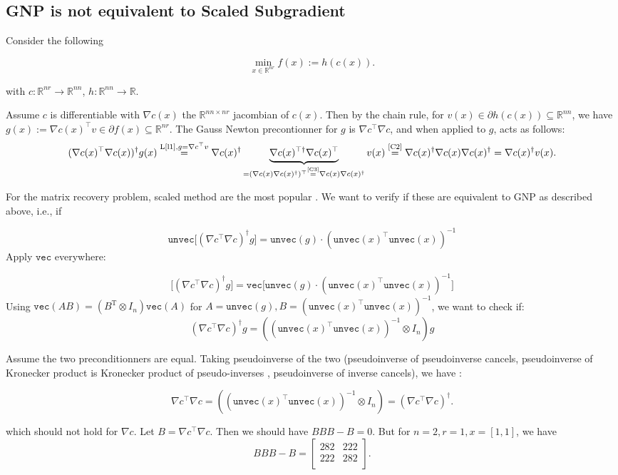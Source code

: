 \documentclass{article}
\begin{document}
\subsection{GNP is not equivalent to Scaled Subgradient}



Consider the following

$$
\min_{x\in \mathbb{R}^{nr} } f(x):= h(c(x)).

$$

with $c: \mathbb{R}^{nr} \to \mathbb{R}^{nn}$, $h:\mathbb{R}^{nn} \to \mathbb{R}$.


Assume $c$ is differentiable with $\nabla c(x)$ the $\mathbb{R}^{nn \times nr}$ jacombian of $c(x)$. Then by the chain rule, for $v(x) \in \partial h ( c(x)) \subseteq \mathbb{R}^{nn}$,  we have $g(x):= \nabla c(x)^{\top} v  \in \partial f(x) \subseteq \mathbb{R}^{nr}$. The Gauss Newton precontionner \cite{davis2022linearly} for $g$ is  $\nabla c ^\top \nabla c$, and when applied to $g$, acts as follows:
\[
(\nabla c(x)^\top \nabla c(x))^{\dagger} g(x) \overset{\text{L\ref{l1},}g=\nabla c^\top v}{=} \nabla c(x)^\dagger \underbrace{\nabla c(x)^{\top \dagger } \nabla c(x)^\top}_{ = (\nabla c(x) \nabla c(x)^\dagger)^\top \overset{\text{\ref{C3}}}{=} \nabla c(x) \nabla c(x)^\dagger  } v(x)  \overset{\text{\ref{C2}}}{=} \nabla c(x)^\dagger \nabla c(x) \nabla c(x)^\dagger = \nabla c(x)^\dagger v(x).
\]


For the matrix recovery problem,  scaled method are the most popular \cite{Tong_2021,tong2021accelerating}. We want to verify if these are equivalent to GNP as described above, i.e., if


$$
\texttt{unvec}\big[(\nabla c^\top \nabla c)^\dagger g  \big]  = \texttt{unvec}(g) \cdot (\texttt{unvec}(x)^\top \texttt{unvec}(x))^{-1}
$$
Apply $\texttt{vec}$ everywhere:

$$
\big[(\nabla c^\top \nabla c)^\dagger g  \big]  = \texttt{vec} \big[ \texttt{unvec}(g) \cdot (\texttt{unvec}(x)^\top \texttt{unvec}(x))^{-1} \big ]
$$
Using $\texttt{vec}(AB) = (B^{\mathrm{T}} \otimes I_{n})\texttt{vec}(A)$ for $A=\texttt{unvec}(g), B=(\texttt{unvec}(x)^\top \texttt{unvec}(x))^{-1}$, we want to check if:
$$
(\nabla c^\top \nabla c)^\dagger  g = ((\texttt{unvec}(x)^\top \texttt{unvec}(x))^{-1}\otimes I_{n}) g
$$

Assume the two preconditionners are equal. Taking pseudoinverse of the two (pseudoinverse of pseudoinverse cancels, pseudoinverse of Kronecker product is Kronecker product of pseudo-inverses \cite{Langville2004Kronecker}, pseudoinverse of inverse cancels), we have :

$$
\nabla c^\top \nabla c = ((\texttt{unvec}(x)^\top \texttt{unvec}(x))^{-1}\otimes I_{n}) = (\nabla c^\top \nabla c)^\dagger.
$$

which should not hold for $\nabla c$. Let $B=\nabla c^\top \nabla c$. Then we should have $BBB-B=0$. But for $n=2,r=1, x= [1,1]$, we have
$$
BBB - B =    \left[ {\begin{array}{cc}
   282 & 222 \\
   222 & 282 \\
  \end{array} } \right].
$$





\end{document}
